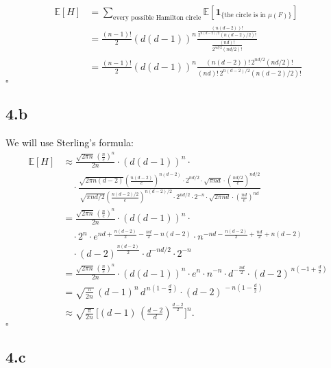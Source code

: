 \documentclass{article}
\begin{document}
\begin{align*}
\mathbb{E}[H] 
  &= \sum_{\text{every possible Hamilton circle}}
      \mathbb{E}\!\left[ \mathbf{1}_{\{\text{the circle is in }\mu(F)\}} \right] \\[6pt]
  &= \frac{(n-1)!}{2}(d(d-1))^n
      \frac{\tfrac{(n(d-2))!}{2^{n(d-2)/2}(n(d-2)/2)!}}
           {\tfrac{(nd)!}{2^{nd/2}(nd/2)!}} \\[6pt]
  &= \frac{(n-1)!}{2}(d(d-1))^n
      \frac{(n(d-2))! \, 2^{nd/2}(nd/2)!}
           {(nd)! \, 2^{n(d-2)/2}(n(d-2)/2)!}
\end{align*}
\hfill $\square$

\subsection*{4.b}
We will use Sterling's formula:
\begin{align*}
\mathbb{E}[H] 
&\approx \frac{\sqrt{2\pi n}\,\left(\tfrac{n}{e}\right)^n}{2n}
    \cdot (d(d-1))^n \cdot \\[6pt]
&\quad \cdot
    \frac{\sqrt{2\pi n(d-2)}\left(\tfrac{n(d-2)}{e}\right)^{n(d-2)} \cdot 2^{nd/2}\cdot\sqrt{\pi nd}\cdot\left(\tfrac{nd/2}{e}\right)^{nd/2}}
         {\sqrt{\pi nd/2}\left(\tfrac{n(d-2)/2}{e}\right)^{n(d-2)/2} \cdot 2^{nd/2}\cdot2^{-n}\cdot\sqrt{2\pi nd}\cdot\left(\tfrac{nd}{e}\right)^{nd}} \\[6pt]
&= \frac{\sqrt{2\pi n}\,\left(\tfrac{n}{e}\right)^n}{2n} \cdot (d(d-1))^n \cdot \\[6pt]
&\quad \cdot 2^n \cdot e^{nd + \tfrac{n(d-2)}{2} - \tfrac{nd}{2} - n(d-2)} \cdot
   n^{-nd - \tfrac{n(d-2)}{2} + \tfrac{nd}{2} + n(d-2)} \\
&\quad \cdot (d-2)^{\tfrac{n(d-2)}{2}} \cdot d^{-nd/2}\cdot 2^{-n} \\[6pt]
&= \frac{\sqrt{2\pi n}\,\left(\tfrac{n}{e}\right)^n}{2n} \cdot (d(d-1))^n\cdot e^n \cdot n^{-n}
    \cdot d^{-\tfrac{nd}{2}} \cdot (d-2)^{\,n(-1+\tfrac{d}{2})} \\[6pt]
&= \sqrt{\frac{\pi}{2n}} \,(d-1)^n \, d^{\,n(1-\tfrac{d}{2})} \cdot (d-2)^{\,-n(1-\tfrac{d}{2})} \\[6pt]
&\approx \sqrt{\frac{\pi}{2n}} \,\Big[(d-1)\,\left(\tfrac{d-2}{d}\right)^{\tfrac{d-2}{2}}\Big]^n.
\end{align*} \hfill $\square$

\subsection*{4.c}
\end{document}

